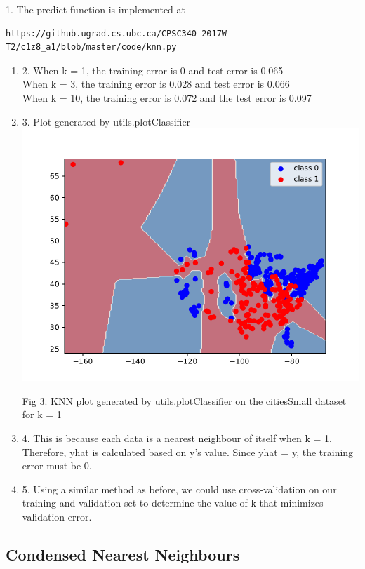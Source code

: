 \documentclass{article}
\def\enum#1{\begin{enumerate}#1\end{enumerate}}
\begin{document}
\hspace{3mm} 1. The predict function is implemented at
\begin{verbatim} 
https://github.ugrad.cs.ubc.ca/CPSC340-2017W-T2/c1z8_a1/blob/master/code/knn.py
\end{verbatim}
\enum{
\item[2.] When k = 1, the training error is 0 and test error is 0.065
\\ When k = 3, the training error is 0.028 and test error is 0.066
\\ When k = 10, the training error is 0.072 and the test error is 0.097
\item[3.] Plot generated by utils.plotClassifier \\
\includegraphics[scale=0.8]{../figs/q4_1_knn_plot_classifier}
\\ \centerline{Fig 3. KNN plot generated by utils.plotClassifier on the citiesSmall dataset for k = 1}
\item[4.] This is because each data is a nearest neighbour of itself when k = 1. Therefore, yhat is calculated based on y's value. Since yhat = y, the training error must be 0. 
\item[5.] Using a similar method as before, we could use cross-validation on our training and validation set to determine the value of k that minimizes validation error.
}
\subsection{Condensed Nearest Neighbours}
\end{document}
